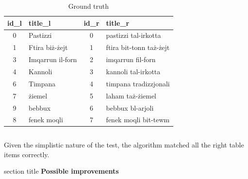 \documentclass[8pt]{beamer} %
\begin{document}
\begin{frame}
\begin{columns}
		\begin{column}{0.5\textwidth}
			\tiny
			\begin{table}
				\centering
				\begin{tabular}{|c|l|c|l|}
					\hline
					\textbf{id\_l} & \textbf{title\_l} & \textbf{id\_r} & \textbf{title\_r} \\ \hline
					0 & Pastizzi & 0 & pastizzi tal-irkotta \\
					1 & Ftira biż-żejt & 1 & ftira bit-tonn taż-żejt \\
					3 & Imqarrun il-forn & 2 & imqarrun fil-forn \\
					4 & Kannoli & 3 & kannoli tal-irkotta \\
					6 & Timpana & 4 & timpana tradizzjonali \\
					7 & żiemel & 5 & laham taż-żiemel \\
					9 & bebbux & 6 & bebbux bl-arjoli \\
					8 & fenek moqli & 7 & fenek moqli bit-tewm \\
					\hline
				\end{tabular}
				\caption{Ground truth}
			\end{table}
		\end{column}
	\end{columns}

	\textnormal{
	Given the simplistic nature of the test, the algorithm matched all the right table items correctly.}
\end{frame}

\begin{frame}[plain]
	\begin{beamercolorbox}[wd=\paperwidth,ht=0.7\paperheight,dp=2ex,center]{section title}
		\Huge \textbf{Possible improvements}
	\end{beamercolorbox}
\end{frame}
\end{document}
